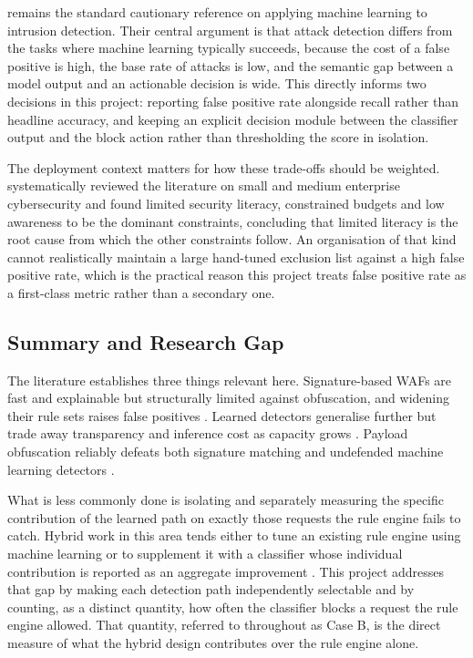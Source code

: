 \documentclass[runningheads]{llncs}
\begin{document}
\citet{sommer2010} remains the standard cautionary reference on
applying machine learning to intrusion detection. Their central
argument is that attack detection differs from the tasks where machine
learning typically succeeds, because the cost of a false positive is
high, the base rate of attacks is low, and the semantic gap between a
model output and an actionable decision is wide. This directly informs
two decisions in this project: reporting false positive rate alongside
recall rather than headline accuracy, and keeping an explicit decision
module between the classifier output and the block action rather than
thresholding the score in isolation.

The deployment context matters for how these trade-offs should be
weighted. \citet{rombaldo2023} systematically reviewed the literature
on small and medium enterprise cybersecurity and found limited security
literacy, constrained budgets and low awareness to be the dominant
constraints, concluding that limited literacy is the root cause from
which the other constraints follow. An organisation of that kind cannot
realistically maintain a large hand-tuned exclusion list against a high
false positive rate, which is the practical reason this project treats
false positive rate as a first-class metric rather than a secondary
one.

\subsection{Summary and Research Gap}

The literature establishes three things relevant here. Signature-based
WAFs are fast and explainable but structurally limited against
obfuscation, and widening their rule sets raises false positives
\citep{applebaum2021, reyesnarvaez2025, tran2020}. Learned detectors
generalise further but trade away transparency and inference cost as
capacity grows \citep{durmuskaya2025, dawadi2023, li2026}. Payload
obfuscation reliably defeats both signature matching and undefended
machine learning detectors \citep{demetrio2020, qu2024}.

What is less commonly done is isolating and separately measuring the
specific contribution of the learned path on exactly those requests the
rule engine fails to catch. Hybrid work in this area tends either to
tune an existing rule engine using machine learning
\citep{scano2024, tran2020} or to supplement it with a classifier whose
individual contribution is reported as an aggregate improvement
\citep{betarte2018}. This project addresses that gap by making each
detection path independently selectable and by counting, as a distinct
quantity, how often the classifier blocks a request the rule engine
allowed. That quantity, referred to throughout as Case B, is the direct
measure of what the hybrid design contributes over the rule engine
alone.
\end{document}
